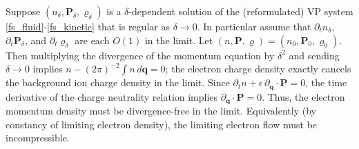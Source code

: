 \documentclass[%
 aip,
 amsmath,amssymb,
reprint, onecolumn %
]{revtex4-1}
\begin{document}
Suppose $(n_\delta,\bm{P}_\delta,\varrho_\delta)$ is a $\delta$-dependent solution of the (reformulated) VP system \eqref{fs_fluid}-\eqref{fs_kinetic} that is regular as $\delta\rightarrow 0$. In particular assume that $\partial_tn_\delta$, $\partial_t\bm{P}_\delta$, and $\partial_t{\varrho}_\delta$ are each $O(1)$ in the limit. Let $(n,\bm{P},\varrho) = (n_0,\bm{P}_0,\varrho_0)$. Then multiplying the divergence of the momentum equation by $\delta^2$ and sending $\delta\rightarrow 0$ implies $n - (2\pi)^{-2}\int n\,d\bm{q} = 0$; the electron charge density exactly cancels the background ion charge density in the limit. Since $\partial_tn + \epsilon\,\partial_{\bm{q}}\cdot\bm{P} = 0$, the time derivative of the charge neutrality relation implies $\partial_{\bm{q}}\cdot\bm{P} = 0$. Thus, the electron momentum density must be divergence-free in the limit. Equivalently (by constancy of limiting electron density), the limiting electron flow must be incompressible. 
\end{document}
